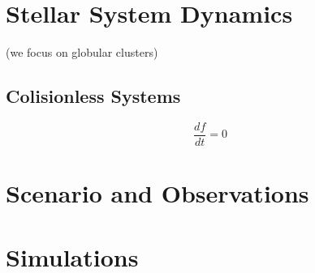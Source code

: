 \section{Stellar System Dynamics}

(we focus on globular clusters)

\subsection{Colisionless Systems}

\begin{equation}
\dfrac{df}{dt}=0
\end{equation}


\section{Scenario and Observations}

\section{Simulations}
